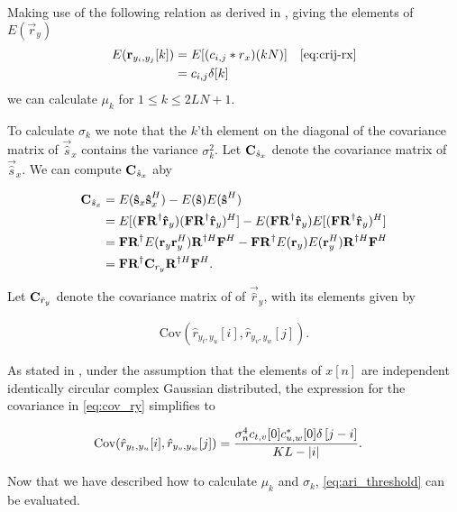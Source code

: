 \documentclass[a4paper, openany, oneside]{memoir}
\begin{document}
Making use of the following relation as derived in \cite{ariananda2012compressive}, giving  the elements of $E(\vec{r}_y)$ 
\begin{align*}
E(\vec{r}_{y_i, y_j}[k]) &= E[(c_{i,j} \ast r_x) (kN)] & \text{\cref{eq:crij-rx}} \\
&= c_{i,j} \delta[k]
\end{align*}
we can calculate $\mu_k$ for $1 \leq k \leq 2LN+1$.

To calculate $\sigma_k$ we note that the $k$'th element on the diagonal of the covariance matrix of $\vec{\hat{s}}_x$ contains the variance $\sigma_k^2$. Let $\boldsymbol{\mathbf{C}}_{\hat{s}_x}$ denote the covariance matrix of $\vec{\hat{s}}_x$.  We can compute $\boldsymbol{\mathbf{C}}_{\hat{s}_x}$ aby

\begin{align}\label{eq:terror_cov_sx}
\boldsymbol{\mathbf{C}}_{\hat{s}_x} &= E(\boldsymbol{\mathbf{\hat{s}}}_x\boldsymbol{\mathbf{\hat{s}}}_x^H) - E(\boldsymbol{\mathbf{\hat{s}}})E(\boldsymbol{\mathbf{\hat{s}}}^H) \\
&= E[(\boldsymbol{\mathbf{F}} \boldsymbol{\mathbf{R}}^{\dagger}\boldsymbol{\mathbf{\hat{r}}}_y) ( \boldsymbol{\mathbf{F}}\boldsymbol{\mathbf{R}}^{\dagger}\boldsymbol{\mathbf{\hat{r}}}_y)^H] - E(\boldsymbol{\mathbf{F}}\boldsymbol{\mathbf{R}}^{\dagger}\boldsymbol{\mathbf{\hat{r}}}_y)E[(\boldsymbol{\mathbf{F}}\boldsymbol{\mathbf{R}}^{\dagger}\boldsymbol{\mathbf{\hat{r}}}_y)^H] \nonumber \\
&= \boldsymbol{\mathbf{F}}\boldsymbol{\mathbf{R}}^{\dagger} E(\boldsymbol{\mathbf{r}}_y\boldsymbol{\mathbf{r}}_y^H)  \boldsymbol{\mathbf{R}}^{\dagger H}\boldsymbol{\mathbf{F}}^H -  \boldsymbol{\mathbf{F}}\boldsymbol{\mathbf{R}}^{\dagger} E( \boldsymbol{\mathbf{r}}_y) E(\boldsymbol{\mathbf{r}}_y^H)  \boldsymbol{\mathbf{R}}^{\dagger H}\boldsymbol{\mathbf{F}}^H \nonumber \\
&= \boldsymbol{\mathbf{F}}\boldsymbol{\mathbf{R}}^{\dagger} \boldsymbol{\mathbf{C}}_{r_y} \boldsymbol{\mathbf{R}}^{\dagger H}\boldsymbol{\mathbf{F}}^H.\nonumber
\end{align}

Let $\boldsymbol{\mathbf{C}}_{\hat{r}_y}$ denote the covariance matrix of of $\vec{\hat{r}}_y$, with its elements given by

\begin{align}\label{eq:cov_ry}
\text{Cov}(\hat{r}_{y_t,y_u}[i],\hat{r}_{y_v, y_w}[j]).
\end{align}

As stated in \cite{ariananda2012compressive}, under the assumption that the elements of $x[n]$ are independent identically circular complex Gaussian distributed, the expression for the covariance in \cref{eq:cov_ry} simplifies to

\begin{align}\label{eq:elem_cov_ry}
\text{Cov}(\hat{r}_{y_t,y_u}[i],\hat{r}_{y_v, y_w}[j]) &= \frac{\sigma_n^4 c_{t,v}[0] c^*_{u,w}[0] \delta \left[ j-i\right]}{KL-|i|}.
\end{align}

Now that we have described how to calculate $\mu_k$ and $\sigma_k$, \cref{eq:ari_threshold} can be evaluated.
\end{document}
